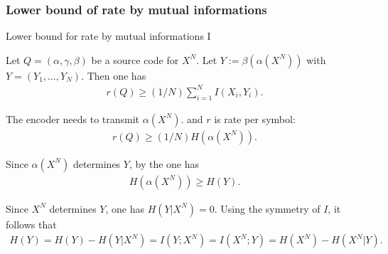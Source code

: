%
%

\subsubsection{Lower bound of rate by mutual informations}

\begin{frame}{Lower bound for rate by mutual informations I}
\begin{proposition}
Let $Q=(\alpha,\gamma,\beta)$ be a source code for $X^N$. 
Let $Y:=\beta(\alpha(X^N))$ with $Y=(Y_1,\dots,Y_N)$.
Then one has 
\begin{align}\label{EqRateSumMut}
r(Q)\geq (1/N)\sum_{i=1}^{N}I(X_i,Y_i).
\end{align}
\end{proposition}
\bit 
\item The encoder needs to transmit $\alpha(X^N)$.  and $r$ is rate per symbol:
\begin{align*}
r(Q)\geq (1/N)H(\alpha(X^N)).
\end{align*}
\item Since $\alpha(X^N)$ determines $Y$, by the  one has 
\begin{align*}
H(\alpha(X^N))\geq H(Y).
\end{align*}
\item Since $X^N$ determines $Y$, one has $H(Y|X^N)=0$.  Using the symmetry of $I$, it follows that
\begin{align*}
H(Y)=H(Y)-H(Y|X^N)=I(Y;X^N)=I(X^N;Y)=H(X^N)-H(X^N|Y).
\end{align*}
\eit 
\end{frame}


